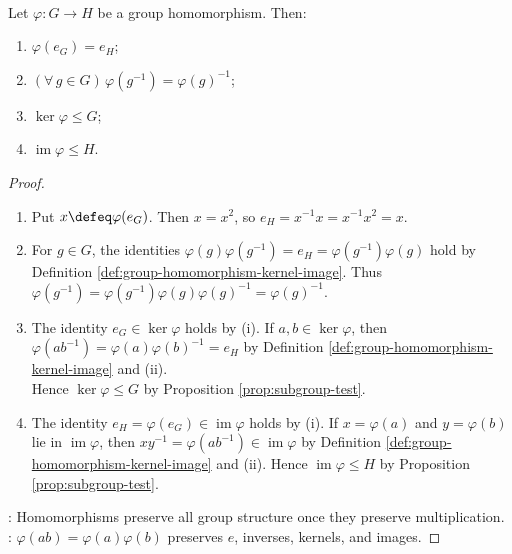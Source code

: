 \begin{proposition} \label{prop:group-homomorphism-basic-properties} \\
Let $\varphi:G\to H$ be a group homomorphism. Then:
\begin{enumerate}[label=(\roman*)]
\setlength{\itemsep}{0pt}
\item $\varphi(e_G)=e_H$;
\item $(\forall\,g\in G)\,\varphi(g^{-1})=\varphi(g)^{-1}$;
\item $\ker\varphi\leq G$;
\item $\operatorname{im}\varphi\leq H$.
\end{enumerate}
\begin{proof}
\begin{enumerate}[label=(\roman*)]
\setlength{\itemsep}{0pt}
\item Put $x\defeq\varphi(e_G)$. Then $x=x^2$, so $e_H=x^{-1}x=x^{-1}x^2=x$.
\item For $g\in G$, the identities $\varphi(g)\varphi(g^{-1})=e_H=\varphi(g^{-1})\varphi(g)$ hold by Definition \ref{def:group-homomorphism-kernel-image}. Thus $\varphi(g^{-1})=\varphi(g^{-1})\varphi(g)\varphi(g)^{-1}=\varphi(g)^{-1}$.
\item The identity $e_G\in\ker\varphi$ holds by (i). If $a,b\in\ker\varphi$, then $\varphi(ab^{-1})=\varphi(a)\varphi(b)^{-1}=e_H$ by Definition \ref{def:group-homomorphism-kernel-image} and (ii).\\
Hence $\ker\varphi\leq G$ by Proposition \ref{prop:subgroup-test}.
\item The identity $e_H=\varphi(e_G)\in\operatorname{im}\varphi$ holds by (i). If $x=\varphi(a)$ and $y=\varphi(b)$ lie in $\operatorname{im}\varphi$, then $xy^{-1}=\varphi(ab^{-1})\in\operatorname{im}\varphi$ by Definition \ref{def:group-homomorphism-kernel-image} and (ii). Hence $\operatorname{im}\varphi\leq H$ by Proposition \ref{prop:subgroup-test}.
\end{enumerate}
: Homomorphisms preserve all group structure once they preserve multiplication.\\
: $\varphi(ab)=\varphi(a)\varphi(b)$ preserves $e$, inverses, kernels, and images.
\end{proof}
\end{proposition}

